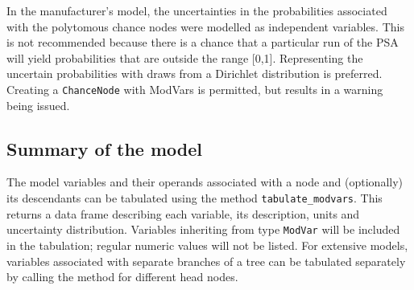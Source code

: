 \documentclass[
]{article}
\newenvironment{Shaded}{\begin{snugshade}}{\end{snugshade}}
\newcommand{\CommentTok}[1]{\textcolor[rgb]{0.56,0.35,0.01}{\textit{#1}}}
\newcommand{\DataTypeTok}[1]{\textcolor[rgb]{0.13,0.29,0.53}{#1}}
\newcommand{\DecValTok}[1]{\textcolor[rgb]{0.00,0.00,0.81}{#1}}
\newcommand{\KeywordTok}[1]{\textcolor[rgb]{0.13,0.29,0.53}{\textbf{#1}}}
\newcommand{\NormalTok}[1]{#1}
\newcommand{\OperatorTok}[1]{\textcolor[rgb]{0.81,0.36,0.00}{\textbf{#1}}}
\newcommand{\StringTok}[1]{\textcolor[rgb]{0.31,0.60,0.02}{#1}}
\begin{document}
\begin{Shaded}
\end{Shaded}

In the manufacturer's model, the uncertainties in the probabilities
associated with the polytomous chance nodes were modelled as independent
variables. This is not recommended because there is a chance that a
particular run of the PSA will yield probabilities that are outside the
range {[}0,1{]}. Representing the uncertain probabilities with draws
from a Dirichlet distribution is preferred. Creating a
\texttt{ChanceNode} with ModVars is permitted, but results in a warning
being issued.

\hypertarget{summary-of-the-model}{%
\subsection{Summary of the model}\label{summary-of-the-model}}

The model variables and their operands associated with a node and
(optionally) its descendants can be tabulated using the method
\texttt{tabulate\_modvars}. This returns a data frame describing each
variable, its description, units and uncertainty distribution. Variables
inheriting from type \texttt{ModVar} will be included in the tabulation;
regular numeric values will not be listed. For extensive models,
variables associated with separate branches of a tree can be tabulated
separately by calling the method for different head nodes.
\end{document}
